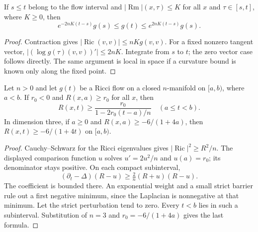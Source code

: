 \begin{proposition}\label{prop:rf-metric-comparison}
If $s\leq t$ belong to the flow interval and
$|\operatorname{Rm}|(x,\tau)\leq K$ for all $x$ and $\tau\in[s,t]$, where
$K\geq0$, then
\[
 e^{-2nK(t-s)}g(s)\leq g(t)\leq e^{2nK(t-s)}g(s).
\]
\end{proposition}
\begin{proof}
Contraction gives $|\operatorname{Ric}(v,v)|\leq nK g(v,v)$.
For a fixed nonzero tangent vector,
$|(\log g(\tau)(v,v))'|\leq2nK$.  Integrate from $s$ to $t$;
the zero vector case follows directly.  The same argument is local in
space if a curvature bound is known only along the fixed point.
\end{proof}

\begin{proposition}\label{prop:rf-scalar}
Let $n>0$ and let $g(t)$ be a Ricci flow on a closed $n$-manifold on
$[a,b)$, where $a<b$.  If $r_0<0$ and $R(x,a)\geq r_0$ for all $x$, then
\[
 R(x,t)\geq \frac{r_0}{1-2r_0(t-a)/n}\quad(a\leq t<b).
\]
In dimension three, if $a\geq0$ and $R(x,a)\geq-6/(1+4a)$, then
$R(x,t)\geq-6/(1+4t)$ on $[a,b)$.
\end{proposition}
\begin{proof}
Cauchy--Schwarz for the Ricci eigenvalues gives
$|\operatorname{Ric}|^2\geq R^2/n$.  The displayed comparison function
$u$ solves $u'=2u^2/n$ and $u(a)=r_0$; its denominator stays positive.
On each compact subinterval,
\[
 (\partial_t-\Delta)(R-u)\geq \tfrac2n(R+u)(R-u).
\]
The coefficient is bounded there.  An exponential weight and a small
strict barrier rule out a first negative minimum, since the Laplacian
is nonnegative at that minimum.  Let the strict perturbation tend to
zero.  Every $t<b$ lies in such a subinterval.  Substitution of
$n=3$ and $r_0=-6/(1+4a)$ gives the last formula.
\end{proof}

